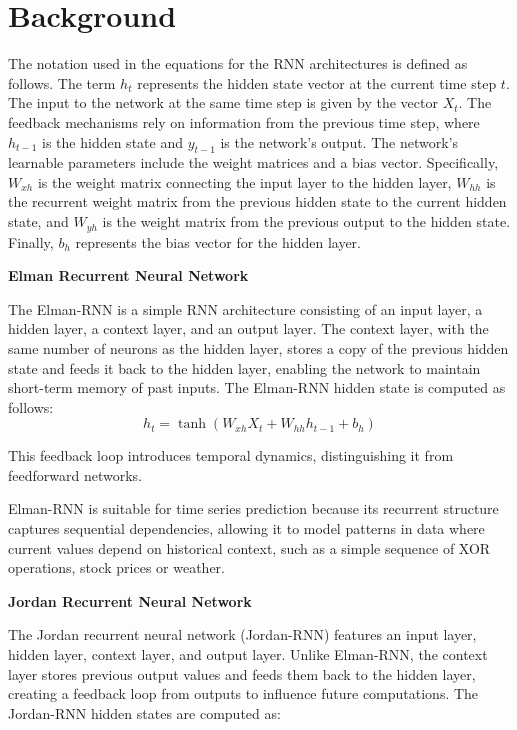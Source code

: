 \documentclass[conference, 10pt]{IEEEtran}
\begin{document}
\section{Background}

The notation used in the equations for the RNN architectures is defined as follows. The term $h_t$ represents the hidden
state vector at the current time step $t$. The input to the network at the same time step is given by the vector $X_t$.
The feedback mechanisms rely on information from the previous time step, where $h_{t-1}$ is the hidden state and
$y_{t-1}$ is the network's output. The network's learnable parameters include the weight matrices and a bias vector.
Specifically, $W_{xh}$ is the weight matrix connecting the input layer to the hidden layer, $W_{hh}$ is the recurrent
weight matrix from the previous hidden state to the current hidden state, and $W_{yh}$ is the weight matrix from the
previous output to the hidden state. Finally, $b_h$ represents the bias vector for the hidden layer.

\textbf{Elman Recurrent Neural Network }

The Elman-RNN is a simple RNN architecture consisting of an input layer, a hidden layer, a context layer, and an output
layer. The context layer, with the same number of neurons as the hidden layer, stores a copy of the previous hidden
state and feeds it back to the hidden layer, enabling the network to maintain short-term memory of past inputs. The
Elman-RNN hidden state is computed as follows:
$$h_t = \tanh(W_{xh}X_t + W_{hh}h_{t-1} + b_h)$$

This feedback loop introduces temporal dynamics, distinguishing it from feedforward
networks.

Elman-RNN is suitable for time series prediction because its recurrent structure captures sequential dependencies,
allowing it to model patterns in data where current values depend on historical context, such as a simple sequence of
XOR operations, stock prices or weather.

\textbf{Jordan Recurrent Neural Network }

The Jordan recurrent neural network (Jordan-RNN) features an input layer, hidden layer, context layer, and output layer. Unlike
Elman-RNN, the context layer stores previous output values and feeds them back to the hidden layer, creating a feedback
loop from outputs to influence future computations. The Jordan-RNN hidden states are computed as:
\end{document}
